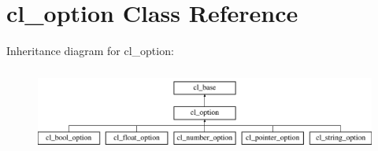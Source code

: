 \hypertarget{classcl__option}{
\section{cl\_\-option Class Reference}
\label{classcl__option}
}
Inheritance diagram for cl\_\-option:\begin{figure}[H]
\begin{center}
\leavevmode
\includegraphics[height=2.800000cm]{classcl__option}
\end{center}
\end{figure}
